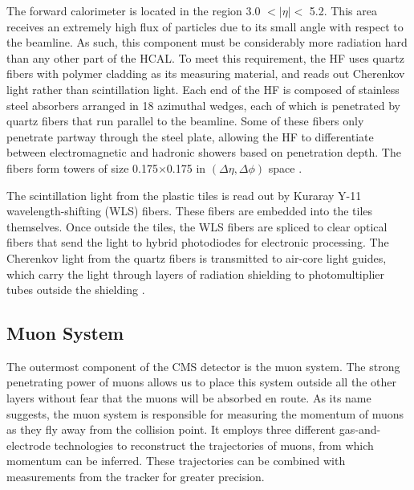 The forward calorimeter is located in the region 3.0 $< |\eta| <$
5.2. This area receives an extremely high flux of particles due to its
small angle with respect to the beamline. As such, this component
must be considerably more radiation hard than any other part of the
HCAL. To meet this requirement, the HF uses quartz fibers with polymer
cladding as its measuring material, and reads out Cherenkov light rather than
scintillation light. Each end of the HF is composed of stainless steel
absorbers arranged in 18 azimuthal wedges, each of which is penetrated
by quartz fibers that run parallel to the beamline. Some of these
fibers only penetrate partway through the steel plate, allowing the HF to
differentiate between electromagnetic and hadronic showers based on
penetration depth. The fibers form towers of size 0.175$\times$0.175
in $(\Delta\eta,\Delta\phi)$ space \cite{accelexper}.

The scintillation light from the plastic tiles is read out by
Kuraray Y-11 wavelength-shifting (WLS) fibers. These fibers are embedded
into the tiles themselves. Once outside the tiles, the WLS fibers are
spliced to clear optical fibers that send the light to hybrid
photodiodes for electronic processing. The Cherenkov light from the
quartz fibers is transmitted to air-core light guides, which carry the
light through layers of radiation shielding to photomultiplier tubes
outside the shielding \cite{accelexper}.


\subsection{Muon System}
\label{ssec:cms:components:muon}

The outermost component of the CMS detector is the muon system. The
strong penetrating power of muons allows us to place this system
outside all the other layers without fear that the muons will be
absorbed en route. As its name suggests, the muon system is
responsible for measuring the momentum of muons as they fly away from
the collision point. It employs three different gas-and-electrode
technologies to reconstruct the trajectories of muons, from which
momentum can be inferred. These trajectories can be combined with
measurements from the tracker for greater precision.


